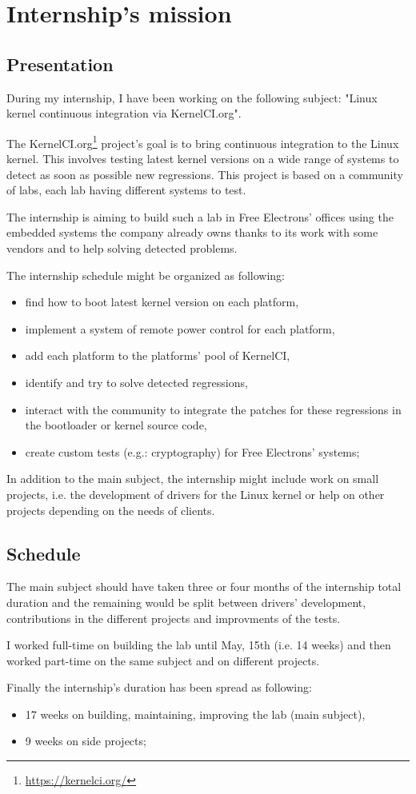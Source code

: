 \chapter{Internship's mission}

\section{Presentation}
During my internship, I have been working on the following subject: "Linux kernel continuous integration via KernelCI.org".

The KernelCI.org\footnote{\url{https://kernelci.org/}} project's goal is to bring continuous integration to the Linux kernel. This involves testing latest kernel versions on a wide range of systems to detect as soon as possible new regressions. This project is based on a community of labs, each lab having different systems to test.

The internship is aiming to build such a lab in Free Electrons' offices using the embedded systems the company already owns thanks to its work with some vendors and to help solving detected problems.

The internship schedule might be organized as following:
\begin{itemize}
  \item find how to boot latest kernel version on each platform,
  \item implement a system of remote power control for each platform,
  \item add each platform to the platforms' pool of KernelCI,
  \item identify and try to solve detected regressions,
  \item interact with the community to integrate the patches for these regressions in the bootloader or kernel source code,
  \item create custom tests (e.g.: cryptography) for Free Electrons' systems;
\end{itemize}

In addition to the main subject, the internship might include work on small projects, i.e. the development of drivers for the Linux kernel or help on other projects depending on the needs of clients.

\section{Schedule}
The main subject should have taken three or four months of the internship total duration and the remaining would be split between drivers' development, contributions in the different projects and improvments of the tests.

I worked full-time on building the lab until May, 15th (i.e. 14 weeks) and then worked part-time on the same subject and on different projects.

Finally the internship's duration has been spread as following:
\begin{itemize}
  \item 17 weeks on building, maintaining, improving the lab (main subject),
  \item 9 weeks on side projects;
\end{itemize}
